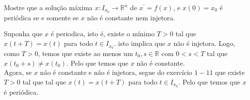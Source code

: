 \begin{homeworkProblem}[1-13]
  Mostre que a solução máxima $x:I_{x_0}\to\mathbb{R}^n$ de $x^{\prime}=f(x)$, e $x(0)=x_0$ é periódica se e somente se $x$ não é constante nem injetora.
  \begin{solution}
    Suponha que $x$ é periodica, isto é, existe o mínimo $T>0$ tal que $x(t+T)=x(t)$ para todo $t\in I_{x_0}$. isto implica que $x$ não é injetora. Logo, como $T>0$, temos que existe ao menos um $t_0,s\in \mathbb{R}$ com $0<s<T$ tal que $x(t_0+s)\neq x(t_0)$. Pelo que temos que $x$ não é constante.\\
    Agora, se $x$ não é constante e não é injetora, segue do exercício $1-11$ que existe $T>0$ tal que tal que $x(t)=x(t+T)$ para todo $t\in I_{x_0}$. Pelo que temos que $x$ é periódica. 
  \end{solution}
\end{homeworkProblem}
